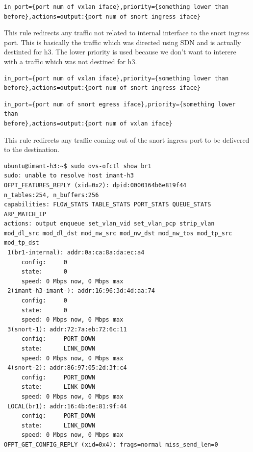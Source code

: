 \documentclass[12pt]{article}
\begin{document}
\begin{verbatim}
in_port={port num of vxlan iface},priority={something lower than
before},actions=output:{port num of snort ingress iface}
\end{verbatim}

This rule redirects any traffic not related to internal interface to the
snort ingress port. This is basically the traffic which was directed using SDN
and is actually destinted for h3. The lower priority is used because we don't
want to interere with a traffic which was not destined for h3.

\begin{verbatim}
in_port={port num of vxlan iface},priority={something lower than
before},actions=output:{port num of snort ingress iface}
\end{verbatim}

\begin{verbatim}
in_port={port num of snort egress iface},priority={something lower than
before},actions=output:{port num of vxlan iface}
\end{verbatim}
This rule redirects any traffic coming out of the snort ingress port
to be delivered to the destination.


\begin{verbatim}
ubuntu@imant-h3:~$ sudo ovs-ofctl show br1
sudo: unable to resolve host imant-h3
OFPT_FEATURES_REPLY (xid=0x2): dpid:0000164b6e819f44
n_tables:254, n_buffers:256
capabilities: FLOW_STATS TABLE_STATS PORT_STATS QUEUE_STATS ARP_MATCH_IP
actions: output enqueue set_vlan_vid set_vlan_pcp strip_vlan mod_dl_src mod_dl_dst mod_nw_src mod_nw_dst mod_nw_tos mod_tp_src mod_tp_dst
 1(br1-internal): addr:0a:ca:8a:da:ec:a4
     config:     0
     state:      0
     speed: 0 Mbps now, 0 Mbps max
 2(imant-h3-imant-): addr:16:96:3d:4d:aa:74
     config:     0
     state:      0
     speed: 0 Mbps now, 0 Mbps max
 3(snort-1): addr:72:7a:eb:72:6c:11
     config:     PORT_DOWN
     state:      LINK_DOWN
     speed: 0 Mbps now, 0 Mbps max
 4(snort-2): addr:86:97:05:2d:3f:c4
     config:     PORT_DOWN
     state:      LINK_DOWN
     speed: 0 Mbps now, 0 Mbps max
 LOCAL(br1): addr:16:4b:6e:81:9f:44
     config:     PORT_DOWN
     state:      LINK_DOWN
     speed: 0 Mbps now, 0 Mbps max
OFPT_GET_CONFIG_REPLY (xid=0x4): frags=normal miss_send_len=0
\end{verbatim}
\end{document}
